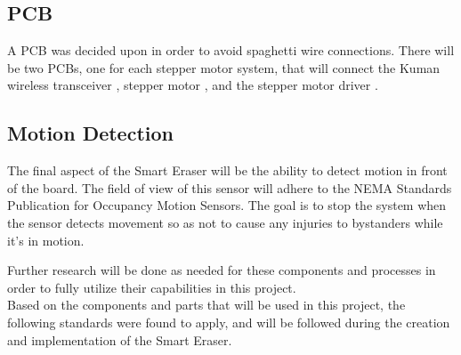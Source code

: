 \subsection{PCB}
A PCB was decided upon in order to avoid spaghetti wire connections. There will be two PCBs, one for each stepper motor system, that will connect the Kuman wireless transceiver \cite{kuman}, stepper motor \cite{smR}, and the stepper motor driver \cite{smdataD}. 

\subsection{Motion Detection}
The final aspect of the Smart Eraser will be the ability to detect motion in front of the board. The field of view of this sensor will adhere to the NEMA Standards Publication for Occupancy Motion Sensors\cite{nema2}. The goal is to stop the system when the sensor detects movement so as not to cause any injuries to bystanders while it's in motion.


Further research will be done as needed for these components and processes in order to fully utilize their capabilities in this project.  \\

Based on the components and parts that will be used in this project, the following standards were found to apply, and will be followed during the creation and implementation of the Smart Eraser.

